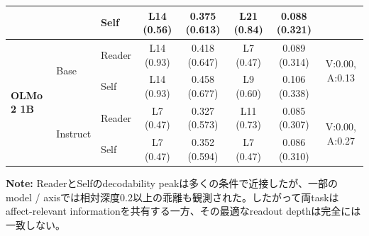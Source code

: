 \begin{table}[htbp]
\begin{tabular}{lll cccc c}
                                 &  & Self   & L14 (0.56) & 0.375 (0.613) & L21 (0.84) & 0.088 (0.321) &  \\
\midrule
\multirow{4}{*}{\textbf{OLMo 2 1B}} & \multirow{2}{*}{Base} & Reader & L14 (0.93) & 0.418 (0.647) & L7 (0.47) & 0.089 (0.314) & \multirow{2}{*}{V:0.00, A:0.13} \\
                                 &  & Self   & L14 (0.93) & 0.458 (0.677) & L9 (0.60) & 0.106 (0.338) &  \\
\cmidrule(lr){2-8}
                                 & \multirow{2}{*}{Instruct} & Reader & L7 (0.47) & 0.327 (0.573) & L11 (0.73) & 0.085 (0.307) & \multirow{2}{*}{V:0.00, A:0.27} \\
                                 &  & Self   & L7 (0.47) & 0.352 (0.594) & L7 (0.47) & 0.086 (0.310) &  \\
\bottomrule
\end{tabular}
\vspace{1ex}
\begin{minipage}{\linewidth}
\footnotesize
\textbf{Note:} ReaderとSelfのdecodability peakは多くの条件で近接したが、一部のmodel / axisでは相対深度0.2以上の乖離も観測された。したがって両taskはaffect-relevant informationを共有する一方、その最適なreadout depthは完全には一致しない。
\end{minipage}
\end{table}